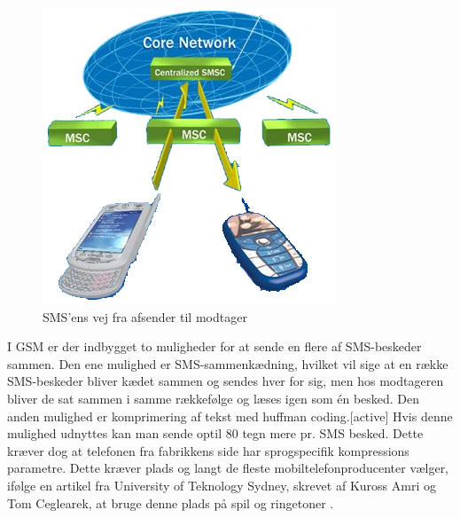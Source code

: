 \begin{figure}[H]
\includegraphics []{Billeder/GSMnetvaerk.png}
\caption {SMS'ens vej fra afsender til modtager \cite{info}}
\label {GSM}
\end{figure} 

I GSM er der indbygget to muligheder for at sende en flere af SMS-beskeder sammen. Den ene mulighed er SMS-sammenkædning, hvilket vil sige at en række SMS-beskeder bliver kædet sammen og sendes hver for sig, men hos modtageren bliver de sat sammen i samme rækkefølge og læses igen som én besked. Den anden mulighed er komprimering af tekst med huffman coding.[active] Hvis denne mulighed udnyttes kan man sende optil 80 tegn mere pr. SMS besked. Dette kræver dog at telefonen fra fabrikkens side har sprogspecifik kompressions parametre. Dette kræver plads og langt de fleste mobiltelefonproducenter vælger, ifølge en artikel fra University of Teknology Sydney, skrevet af Kuross Amri og Tom Ceglearek, at bruge denne plads på spil og ringetoner \cite{UNI}. 
